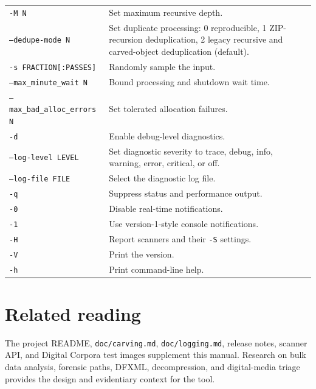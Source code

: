 \documentclass[11pt]{article}
\newcommand{\code}[1]{\texttt{#1}}
\begin{document}
\begin{longtable}{p{.29\linewidth}p{.65\linewidth}}
\code{-M N} & Set maximum recursive depth. \\
\code{--dedupe-mode N} & Set duplicate processing: 0 reproducible, 1 ZIP-recursion deduplication, 2 legacy recursive and carved-object deduplication (default). \\
\code{-s FRACTION[:PASSES]} & Randomly sample the input. \\
\code{--max\_minute\_wait N} & Bound processing and shutdown wait time. \\
\code{--max\_bad\_alloc\_errors N} & Set tolerated allocation failures. \\
\code{-d} & Enable debug-level diagnostics. \\
\code{--log-level LEVEL} & Set diagnostic severity to trace, debug, info, warning, error, critical, or off. \\
\code{--log-file FILE} & Select the diagnostic log file. \\
\code{-q} & Suppress status and performance output. \\
\code{-0} & Disable real-time notifications. \\
\code{-1} & Use version-1-style console notifications. \\
\code{-H} & Report scanners and their \code{-S} settings. \\
\code{-V} & Print the version. \\
\code{-h} & Print command-line help. \\
\bottomrule
\end{longtable}

\section{Related reading}

The project README, \code{doc/carving.md}, \code{doc/logging.md}, release
notes, scanner API, and Digital Corpora test images supplement this manual.
Research on bulk data analysis, forensic paths, DFXML, decompression, and
digital-media triage provides the design and evidentiary context for the tool.



\end{document}
